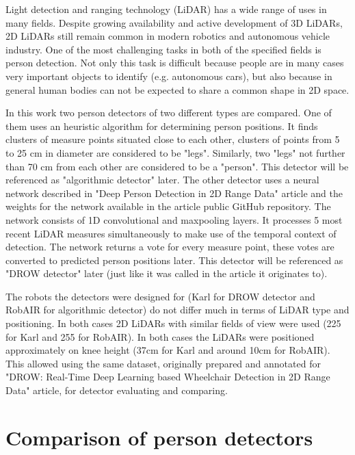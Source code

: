 \documentclass{article}
\begin{document}
Light detection and ranging technology (LiDAR) has a wide range of uses in many fields\cite{lidar_market}.
Despite growing availability and active development of 3D LiDARs, 2D LiDARs still remain common in modern robotics\cite{lidar_popularity} and autonomous vehicle industry\cite{lidar_autonomous}.
One of the most challenging tasks in both of the specified fields is person detection.
Not only this task is difficult because people are in many cases very important objects to identify (e.g. autonomous cars), but also because in general human bodies can not be expected to share a common shape in 2D space.

In this work two person detectors of two different types are compared.
One of them uses an heuristic algorithm for determining person positions.
It finds clusters of measure points situated close to each other, clusters of points from 5 to 25 cm in diameter are considered to be "legs".
Similarly, two "legs" not further than 70 cm from each other are considered to be a "person".
This detector will be referenced as "algorithmic detector" later.
The other detector uses a neural network described in "Deep Person Detection in 2D Range Data"\cite{DROW_2018} article and the weights for the network available in the article public GitHub repository\cite{DROW_repo}.
The network consists of 1D convolutional and maxpooling layers.
It processes 5 most recent LiDAR measures simultaneously to make use of the temporal context of detection.
The network returns a vote for every measure point, these votes are converted to predicted person positions later.
This detector will be referenced as "DROW detector" later (just like it was called in the article it originates to).

The robots the detectors were designed for (Karl for DROW detector and RobAIR\cite{RobAIR_site} for algorithmic detector) do not differ much in terms of LiDAR type and positioning.
In both cases 2D LiDARs with similar fields of view were used (225\textdegree{} for Karl and 255\textdegree{} for RobAIR).
In both cases the LiDARs were positioned approximately on knee height (37cm for Karl and around 10cm for RobAIR).
This allowed using the same dataset, originally prepared and annotated for "DROW: Real-Time Deep Learning based Wheelchair Detection in 2D
Range Data"\cite{DROW_2016} article, for detector evaluating and comparing.

\section{Comparison of person detectors}
\end{document}
